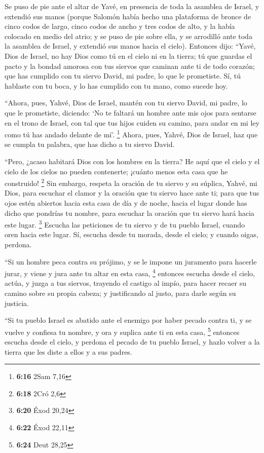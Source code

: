  Se puso de pie ante el altar de Yavé, en presencia de
toda la asamblea de Israel, y extendió sus manos  (porque
Salomón había hecho una plataforma de bronce de cinco codos de largo,
cinco codos de ancho y tres codos de alto, y la había colocado en medio
del atrio; y se puso de pie sobre ella, y se arrodilló ante toda la
asamblea de Israel, y extendió sus manos hacia el cielo).
 Entonces dijo: ``Yavé, Dios de Israel, no hay Dios como
tú en el cielo ni en la tierra; tú que guardas el pacto y la bondad
amorosa con tus siervos que caminan ante ti de todo corazón;
 que has cumplido con tu siervo David, mi padre, lo que
le prometiste. Sí, tú hablaste con tu boca, y lo has cumplido con tu
mano, como sucede hoy.

 ``Ahora, pues, Yahvé, Dios de Israel, mantén con tu
siervo David, mi padre, lo que le prometiste, diciendo: `No te faltará
un hombre ante mis ojos para sentarse en el trono de Israel, con tal que
tus hijos cuiden su camino, para andar en mi ley como tú has andado
delante de mí'. \footnote{\textbf{6:16} 2Sam 7,16} 
Ahora, pues, Yahvé, Dios de Israel, haz que se cumpla tu palabra, que
has dicho a tu siervo David.

 ``Pero, ¿acaso habitará Dios con los hombres en la
tierra? He aquí que el cielo y el cielo de los cielos no pueden
contenerte; ¡cuánto menos esta casa que he construido! \footnote{\textbf{6:18}
  2Cró 2,6}  Sin embargo, respeta la oración de tu siervo
y su súplica, Yahvé, mi Dios, para escuchar el clamor y la oración que
tu siervo hace ante ti;  para que tus ojos estén abiertos
hacia esta casa de día y de noche, hacia el lugar donde has dicho que
pondrías tu nombre, para escuchar la oración que tu siervo hará hacia
este lugar. \footnote{\textbf{6:20} Éxod 20,24}  Escucha
las peticiones de tu siervo y de tu pueblo Israel, cuando oren hacia
este lugar. Sí, escucha desde tu morada, desde el cielo; y cuando oigas,
perdona.

 ``Si un hombre peca contra su prójimo, y se le impone un
juramento para hacerle jurar, y viene y jura ante tu altar en esta casa,
\footnote{\textbf{6:22} Éxod 22,11}  entonces escucha
desde el cielo, actúa, y juzga a tus siervos, trayendo el castigo al
impío, para hacer recaer su camino sobre su propia cabeza; y
justificando al justo, para darle según su justicia.

 ``Si tu pueblo Israel es abatido ante el enemigo por
haber pecado contra ti, y se vuelve y confiesa tu nombre, y ora y
suplica ante ti en esta casa, \footnote{\textbf{6:24} Deut 28,25}
 entonces escucha desde el cielo, y perdona el pecado de
tu pueblo Israel, y hazlo volver a la tierra que les diste a ellos y a
sus padres.


